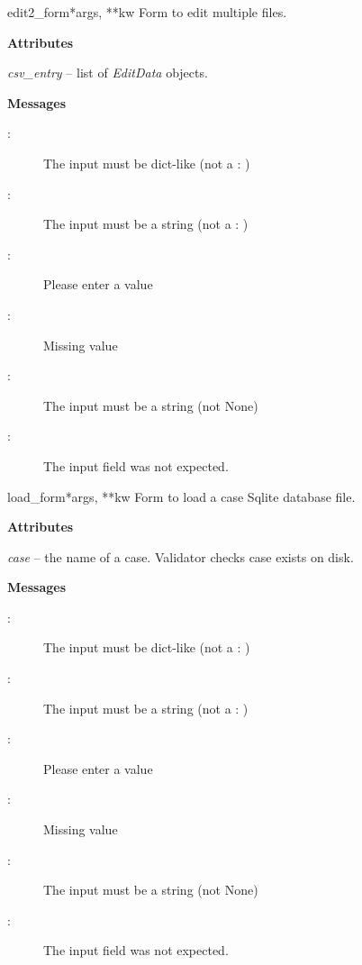 \documentclass[letterpaper,10pt,english]{manual}
\begin{document}
\hypertarget{webscavator.forms.forms.edit2_form}{}\begin{classdesc}{edit2\_form}{*args, **kw}
Form to edit multiple files.

\textbf{Attributes}

\emph{csv\_entry} -- list of \emph{EditData} objects.

\textbf{Messages}
\begin{description}
\item[:]
The input must be dict-like (not a : )

\item[:]
The input must be a string (not a : )

\item[:]
Please enter a value

\item[:]
Missing value

\item[:]
The input must be a string (not None)

\item[:]
The input field  was not expected.

\end{description}
\end{classdesc}

\hypertarget{webscavator.forms.forms.load_form}{}\begin{classdesc}{load\_form}{*args, **kw}
Form to load a case Sqlite database file.

\textbf{Attributes}

\emph{case} -- the name of a case. Validator checks case exists on disk.

\textbf{Messages}
\begin{description}
\item[:]
The input must be dict-like (not a : )

\item[:]
The input must be a string (not a : )

\item[:]
Please enter a value

\item[:]
Missing value

\item[:]
The input must be a string (not None)

\item[:]
The input field  was not expected.

\end{description}
\end{classdesc}
\end{document}

